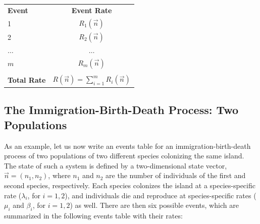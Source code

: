 \begin{center}
	\begin{tabular}{lc}
		\textbf{Event} & \textbf{Event Rate} \\
		
		1          & $R_1(\vec{n})$ \\
		2          & $R_2(\vec{n})$ \\
		$\dots$    & $\dots$        \\
		$m$        & $R_m(\vec{n})$ \\
		           &                \\
		\textbf{Total Rate} & $R(\vec{n}) = \sum_{i=1}^m R_i(\vec{n})$
	\end{tabular}
\end{center}

\subsection{The Immigration-Birth-Death Process: Two Populations}
As an example, let us now write an events table for an immigration-birth-death process of two populations of two different species colonizing the same island. The state of such a system is defined by a two-dimensional state vector, $\vec{n} = (n_1, n_2)$, where $n_1$ and $n_2$ are the number of individuals of the first and second species, respectively. Each species colonizes the island at a species-specific rate ($\lambda_i$, for $i=1,2$), and individuals die and reproduce at species-specific rates ($\mu_i$ and $\beta_i$, for $i=1,2$) as well. There are then six possible events, which are summarized in the following events table with their rates:

